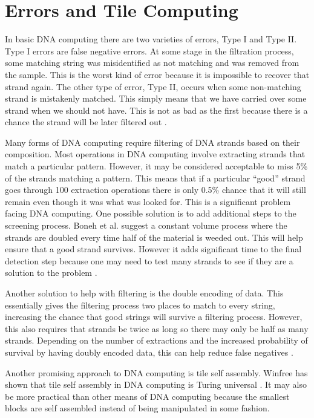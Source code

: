 \documentclass[twocolumn]{article}
\begin{document}
\section{Errors and Tile Computing}
In basic DNA computing there are two varieties of errors, Type I and Type II.
 Type I errors are false negative errors. At some stage in the filtration 
process, some matching string was misidentified as not matching and was removed
from the sample. This is the worst kind of error because it is impossible to 
recover that strand again. The other type of error, Type II, occurs when some 
non-matching strand is mistakenly matched. This simply means that we have 
carried over some strand when we should not have. This is not as bad as the 
first because there is a chance the strand will be later filtered out
\cite{boneh}.

Many forms of DNA computing require filtering of DNA strands based on their 
composition. Most operations in DNA computing involve extracting strands that 
match a particular pattern. However, it may be considered acceptable to miss 
5\% of the strands matching a pattern. This means that if a particular “good” 
strand goes through 100 extraction operations there is only 0.5\% chance that 
it will still remain even though it was what was looked for. This is a 
significant problem facing DNA computing. One possible solution is to add 
additional steps to the screening process. Boneh et al. suggest a constant 
volume process where the strands are doubled every time half of the material 
is weeded out. This will help ensure that a good strand survives. However it 
adds significant time to the final detection step because one may need to test 
many strands to see if they are a solution to the problem \cite{boneh}.

Another solution to help with filtering is the double encoding of data. This 
essentially gives the filtering process two places to match to every string, 
increasing the chance that good strings will survive a filtering process. 
However, this also requires that strands be twice as long so there may only be 
half as many strands. Depending on the number of extractions and the increased 
probability of survival by having doubly encoded data, this can help reduce 
false negatives \cite{boneh}.

Another promising approach to DNA computing is tile self assembly. Winfree has 
shown that tile self assembly in DNA computing is Turing universal
\cite{winfree_98}. It may 
also be more practical than other means of DNA computing because the smallest 
blocks are self assembled instead of being manipulated in some fashion. 
\end{document}
